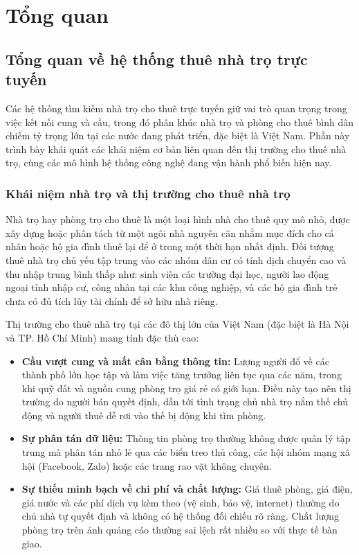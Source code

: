 \chapter{Tổng quan}
\label{Chapter2}

\section{Tổng quan về hệ thống thuê nhà trọ trực tuyến}

Các hệ thống tìm kiếm nhà trọ cho thuê trực tuyến giữ vai trò quan trọng trong việc kết nối cung và cầu, trong đó phân khúc nhà trọ và phòng cho thuê bình dân chiếm tỷ trọng lớn tại các nước đang phát triển, đặc biệt là Việt Nam. Phần này trình bày khái quát các khái niệm cơ bản liên quan đến thị trường cho thuê nhà trọ, cùng các mô hình hệ thống công nghệ đang vận hành phổ biến hiện nay.

\FloatBarrier
\subsection{Khái niệm nhà trọ và thị trường cho thuê nhà trọ}

Nhà trọ hay phòng trọ cho thuê là một loại hình nhà cho thuê quy mô nhỏ, được xây dựng hoặc phân tách từ một ngôi nhà nguyên căn nhằm mục đích cho cá nhân hoặc hộ gia đình thuê lại để ở trong một thời hạn nhất định. Đối tượng thuê nhà trọ chủ yếu tập trung vào các nhóm dân cư có tính dịch chuyển cao và thu nhập trung bình thấp như: sinh viên các trường đại học, người lao động ngoại tỉnh nhập cư, công nhân tại các khu công nghiệp, và các hộ gia đình trẻ chưa có đủ tích lũy tài chính để sở hữu nhà riêng.

Thị trường cho thuê nhà trọ tại các đô thị lớn của Việt Nam (đặc biệt là Hà Nội và TP. Hồ Chí Minh) mang tính đặc thù cao:
\begin{itemize}
    \item \textbf{Cầu vượt cung và mất cân bằng thông tin:} Lượng người đổ về các thành phố lớn học tập và làm việc tăng trưởng liên tục qua các năm, trong khi quỹ đất và nguồn cung phòng trọ giá rẻ có giới hạn. Điều này tạo nên thị trường do người bán quyết định, dẫn tới tình trạng chủ nhà trọ nắm thế chủ động và người thuê dễ rơi vào thế bị động khi tìm phòng.
    \item \textbf{Sự phân tán dữ liệu:} Thông tin phòng trọ thường không được quản lý tập trung mà phân tán nhỏ lẻ qua các biển treo thủ công, các hội nhóm mạng xã hội (Facebook, Zalo) hoặc các trang rao vặt không chuyên.
    \item \textbf{Sự thiếu minh bạch về chi phí và chất lượng:} Giá thuê phòng, giá điện, giá nước và các phí dịch vụ kèm theo (vệ sinh, bảo vệ, internet) thường do chủ nhà tự quyết định và không có hệ thống đối chiếu rõ ràng. Chất lượng phòng trọ trên ảnh quảng cáo thường sai lệch rất nhiều so với thực tế bàn giao.
\end{itemize}


